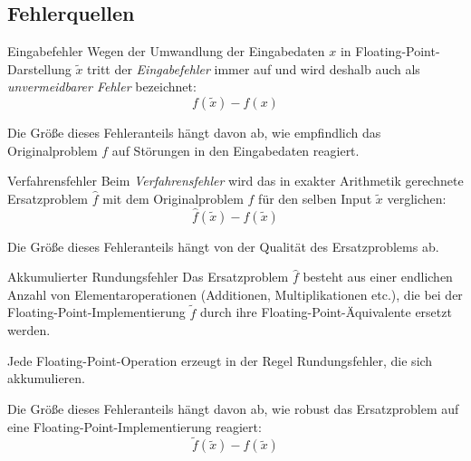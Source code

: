 \subsection{Fehlerquellen}

\begin{defi}{Eingabefehler}
    Wegen der Umwandlung der Eingabedaten $x$ in Floating-Point-Darstellung $\tilde{x}$ tritt der \emph{Eingabefehler} immer auf und wird deshalb auch als \emph{unvermeidbarer Fehler} bezeichnet:
    \[
        f(\tilde{x}) - f(x)
    \]

    Die Größe dieses Fehleranteils hängt davon ab, wie empfindlich das Originalproblem $f$ auf Störungen in den Eingabedaten reagiert.
\end{defi}

\begin{defi}{Verfahrensfehler}
    Beim \emph{Verfahrensfehler} wird das in exakter Arithmetik gerechnete Ersatzproblem $\hat{f}$ mit dem Originalproblem $f$ für den selben Input $\tilde{x}$ verglichen:
    \[
        \hat{f}(\tilde{x}) - f(\tilde{x})
    \]

    Die Größe dieses Fehleranteils hängt von der Qualität des Ersatzproblems ab.
\end{defi}

\begin{defi}{Akkumulierter Rundungsfehler}
    Das Ersatzproblem $\hat{f}$ besteht aus einer endlichen Anzahl von Elementaroperationen (Additionen, Multiplikationen etc.), die bei der Floating-Point-Implementierung $\tilde{f}$ durch ihre Floating-Point-Äquivalente ersetzt werden.

    Jede Floating-Point-Operation erzeugt in der Regel Rundungsfehler, die sich akkumulieren.

    Die Größe dieses Fehleranteils hängt davon ab, wie robust das Ersatzproblem auf eine Floating-Point-Implementierung reagiert:
    \[
        \tilde{f}(\tilde{x}) - \hat{f}(\tilde{x})
    \]
\end{defi}

